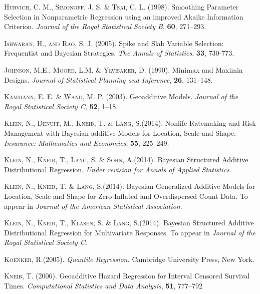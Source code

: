 \documentclass[11pt,a4paper,twoside]{bayesxarticle}
\begin{document}
\begin{thebibliography}{99}
 {\scshape Hurvich, C. M., Simonoff, J. S. \& Tsai, C. L.} (1998).
 Smoothing Parameter Selection in Nonparametric Regression using an improved {A}kaike Information Criterion.
 {\it Journal of the Royal Statistical Society B}, {\bf 60}, 271--293.

 {\scshape Ishwaran, H., and Rao, S. J.} (2005). Spike and Slab Variable
 Selection: Frequentist and Bayesian Strategies. {\it The Annals of Statistics},
 {\bf 33}, 730-773.

 {\scshape Johnson, M.E., Moore, L.M. \& Ylvisaker, D.} (1990).
 Minimax and Maximin Designs.
 {\it Journal of Statistical Planning and Inference}, {\bf 26}, 131--148.

 {\scshape Kammann, E. E. \& Wand, M. P.} (2003).
 Geoadditive Models.
 {\it Journal of the Royal Statistical Society C}, {\bf 52}, 1--18.


{\scshape Klein, N., Denuit, M., Kneib, T. \& Lang, S.}(2014).
Nonlife Ratemaking and Risk Management with Bayesian additive Models for Location, Scale and Shape.
{\it Insurance: Mathematics and Economics}, {\bf 55}, 225--249.


{\scshape Klein, N., Kneib, T., Lang, S. \& Sohn, A.}(2014).
Bayesian Structured Additive Distributional Regression.
{\it Under revision for Annals of Applied Statistics}.


{\scshape Klein, N., Kneib, T. \& Lang, S.}(2014).
Bayesian Generalized Additive Models for Location, Scale and Shape for Zero-Inflated and Overdispersed Count Data.
To appear in {\it Journal of the American Statistical Association}.


{\scshape Klein, N., Kneib, T., Klasen, S. \& Lang, S.}(2014).
Bayesian Structured Additive Distributional Regression for Multivariate Responses.
To appear in {\it Journal of the Royal Statistical Society C}.


{\scshape Koenker, R.}(2005).
{\it Quantile Regression.}
Cambridge University Press, New York.



 {\scshape Kneib, T.} (2006).
 Geoadditive Hazard Regression for Interval Censored Survival Times.
 {\it Computational Statistics and Data Analysis}, {\bf 51}, 777--792


\end{thebibliography}
\end{document}
